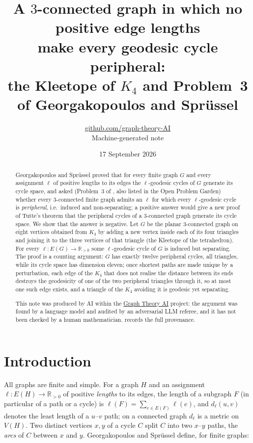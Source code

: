 \documentclass[11pt,a4paper]{article}
\title{A $3$-connected graph in which no positive edge lengths\\ make every geodesic cycle peripheral:\\ the Kleetope of $K_4$ and Problem~3 of Georgakopoulos and Sprüssel}
\author{\href{https://github.com/graph-theory-AI}{github.com/graph-theory-AI}\\[2pt] \normalsize Machine-generated note}
\date{17 September 2026}
\theoremstyle{plain}
\theoremstyle{definition}
\theoremstyle{remark}
\newcommand{\R}{\mathbb R}
\newcommand{\dl}{d_\ell}
\begin{document}
\maketitle

\begin{abstract}
Georgakopoulos and Sprüssel proved that for every finite graph $G$ and every assignment $\ell$ of positive lengths to its edges the $\ell$-geodesic cycles of $G$ generate its cycle space, and asked (Problem~3 of \cite{GS09}, also listed in the Open Problem Garden) whether every $3$-connected finite graph admits an $\ell$ for which every $\ell$-geodesic cycle is \emph{peripheral}, i.e.\ induced and non-separating; a positive answer would give a new proof of Tutte's theorem that the peripheral cycles of a $3$-connected graph generate its cycle space. We show that the answer is negative. Let $G$ be the planar $3$-connected graph on eight vertices obtained from $K_4$ by adding a new vertex inside each of its four triangles and joining it to the three vertices of that triangle (the Kleetope of the tetrahedron). For every $\ell\colon E(G)\to\R_{>0}$ some $\ell$-geodesic cycle of $G$ is induced but separating. The proof is a counting argument: $G$ has exactly twelve peripheral cycles, all triangles, while its cycle space has dimension eleven; once shortest paths are made unique by a perturbation, each edge of the $K_4$ that does not realise the distance between its ends destroys the geodesicity of one of the two peripheral triangles through it, so at most one such edge exists, and a triangle of the $K_4$ avoiding it is geodesic yet separating.

\medskip\noindent\small
This note was produced by AI within the \href{https://github.com/graph-theory-AI/Graph-Theory-LLM-Proofs}{Graph Theory AI} project:
the argument was found by a language model and audited by an adversarial LLM
referee, and it has not been checked by a human mathematician.
 records the full provenance.
\end{abstract}

\section{Introduction}

All graphs are finite and simple. For a graph $H$ and an assignment $\ell\colon E(H)\to\R_{>0}$ of positive \emph{lengths} to its edges, the length of a subgraph $F$ (in particular of a path or a cycle) is $\ell(F)=\sum_{e\in E(F)}\ell(e)$, and $\dl(u,v)$ denotes the least length of a $u$--$v$ path; on a connected graph $\dl$ is a metric on $V(H)$. Two distinct vertices $x,y$ of a cycle $C$ split $C$ into two $x$--$y$ paths, the \emph{arcs} of $C$ between $x$ and $y$. Georgakopoulos and Sprüssel \cite[\S3.1]{GS09} define, for finite graphs:
\end{document}
